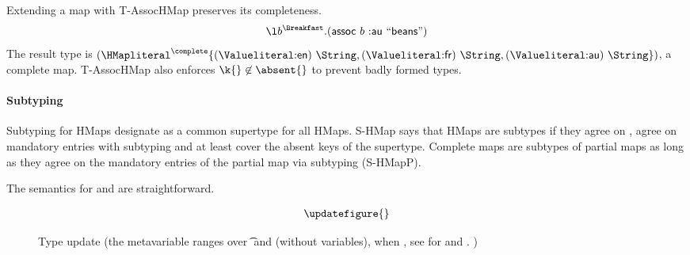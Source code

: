 Extending a map with T-AssocHMap preserves its completeness.
$$
\abs{\makelocal{b}}{\Breakfast}{\assocexp{\makelocal{b}}{\makekw{au}}{\makestr{beans}}}
$$
The result type is
$
\HMapc{\mandatoryset{\mandatoryentrynoarrow{\Valkw{en}}{\String}, {\mandatoryentrynoarrow{\Valkw{fr}}{\String}}
        ,{\mandatoryentrynoarrow{\Valkw{au}}{\String}}}}
$,
a complete map.
T-AssocHMap also enforces ${\k{}} \not\in {\absent{}}$ to prevent badly formed types.


\paragraph{Subtyping}
Subtyping for HMaps
designate \MapLiteral{} as a common supertype for all HMaps.
S-HMap says that HMaps are subtypes if they agree
on \completenessmeta{}, agree on mandatory entries with subtyping
and at least cover the absent keys of the supertype.
Complete maps are subtypes of partial maps
as long as they agree on the mandatory entries of the partial map via subtyping (S-HMapP).



The semantics for \getliteral{} and \assocliteral{} are straightforward.

\begin{figure}
  $$
\begin{array}{llll}
\updatefigure{}
\end{array}
$$
\caption{Type update (the metavariable \propisnotmeta{} ranges over \t{} and \nottype{\t{}} (without variables), 
  \notsubtypein{}{\Nil{}}{\nottype{\t{}}} when \issubtypein{}{\Nil{}}{\t{}}, see
 for \restrictliteral{} and \removeliteral{}.
  )}
\label{main:figure:update}
\end{figure}

